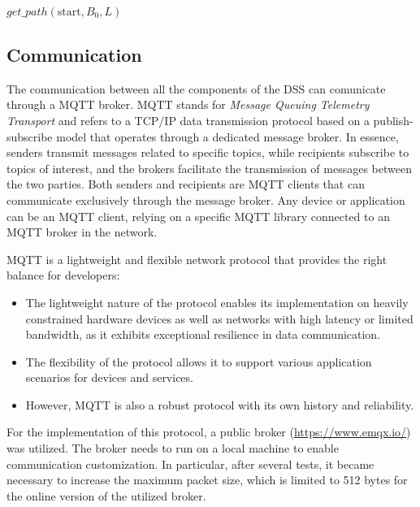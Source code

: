 \documentclass[journal,article,submit,pdftex,moreauthors]{Definitions/mdpi}
\begin{document}
\begin{algorithm}
\begin{algorithmic}
        
        \EndWhile
        
        \State $get\_path(\text{start}, B_0, L)$
    \end{algorithmic}
\end{algorithm}


\subsection{Communication}
The communication between all the components of the DSS can comunicate through a MQTT broker.
MQTT stands for \textit{Message Queuing Telemetry Transport} and refers to a TCP/IP data transmission protocol based on a publish-subscribe model that operates through a dedicated message broker. In essence, senders transmit messages related to specific topics, while recipients subscribe to topics of interest, and the brokers facilitate the transmission of messages between the two parties. Both senders and recipients are MQTT clients that can communicate exclusively through the message broker. Any device or application can be an MQTT client, relying on a specific MQTT library connected to an MQTT broker in the network.

MQTT is a lightweight and flexible network protocol that provides the right balance for developers:
\begin{itemize}
    \item The lightweight nature of the protocol enables its implementation on heavily constrained hardware devices as well as networks with high latency or limited bandwidth, as it exhibits exceptional resilience in data communication.
    \item The flexibility of the protocol allows it to support various application scenarios for devices and services.
    \item However, MQTT is also a robust protocol with its own history and reliability.
\end{itemize}

For the implementation of this protocol, a public broker (\url{https://www.emqx.io/}) was utilized. The broker needs to run on a local machine to enable communication customization. In particular, after several tests, it became necessary to increase the maximum packet size, which is limited to 512 bytes for the online version of the utilized broker.
\end{document}
